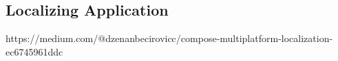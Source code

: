 
\subsection{Localizing Application}

\cite{Beci24} https://medium.com/@dzenanbecirovicc/compose-multiplatform-localization-ec6745961ddc